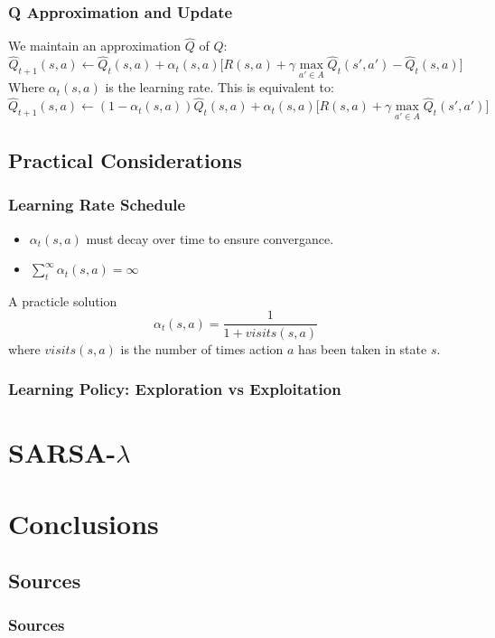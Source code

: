 \documentclass[ignorenonframetext]{beamer}
\begin{document}
\begin{frame}
	\frametitle{Q Approximation and Update}
	We maintain an approximation $\hat{Q}$ of $Q$:
	\[
	\hat{Q}_{t+1}(s,a) \leftarrow \hat{Q}_t(s,a) + \alpha_t(s,a)\big[ R(s,a) + \gamma \max_{a' \in A}
	\hat{Q}_t(s',a') - \hat{Q}_t(s,a) \big]
	\]
	Where $\alpha_t(s,a)$ is the learning rate.  
	\pause
	This is equivalent to:
	\[
	\hat{Q}_{t+1}(s,a) \leftarrow (1-\alpha_t(s,a))\hat{Q}_{t}(s,a) + \alpha_t(s,a)\big[ R(s,a) + \gamma \max_{a' \in A}
	\hat{Q}_t(s',a') \big]
	\]
\end{frame}

\subsection{Practical Considerations}

\begin{frame}
	\frametitle{Learning Rate Schedule}
	\begin{itemize}
		\item $\alpha_t(s,a)$ must decay over time to ensure convergance.
		\item $\sum_t^{\infty} \alpha_t(s,a) = \infty$ 
	\end{itemize}
	\begin{block}{A practicle solution}
		\[
		\alpha_t(s,a) = \frac{1}{1 + visits(s,a)}
		\]
		where $visits(s,a)$ is the number of times action $a$ has been
		taken in state $s$.
	\end{block}
\end{frame}

\begin{frame}
	\frametitle{Learning Policy: Exploration vs Exploitation}
\end{frame}

\section{SARSA-$\lambda$}


\section{Conclusions}

\subsection{Sources}
\begin{frame}[allowframebreaks]
	\frametitle{Sources}
	\nocite{*}
	
	
\end{frame}
\end{document}
